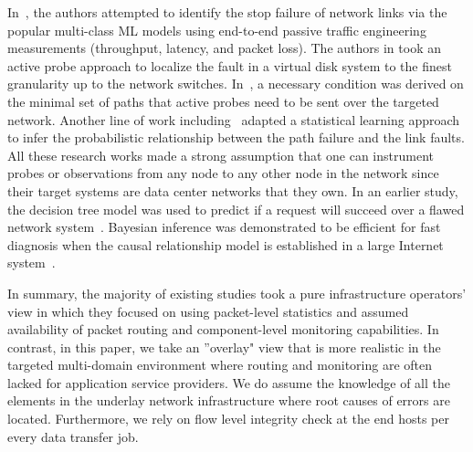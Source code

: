 In~\cite{Link-JIoT-2019}, the authors attempted to identify the stop failure of network links via the popular multi-class ML models using end-to-end passive traffic engineering measurements (throughput, latency, and packet loss). The authors in \cite{DeepView:NSDI18} took an active probe approach to localize the fault in a virtual disk system to the finest granularity up to the network switches. In~\cite{netbouncer:nsdi18}, a necessary condition was derived on the minimal set of paths that active probes need to be sent over the targeted network. Another line of work including~\cite{NetPoirot:Sigcomm2016,KDD14} adapted a statistical learning approach to infer the probabilistic relationship between the path failure and the link faults. All these research works made a strong assumption that one can instrument probes or observations from any node to any other node in the network since their target systems are data center networks that they own. In an earlier study, the decision tree model was used to predict if a request will succeed over a flawed network system~\cite{DT:2004}. Bayesian inference was demonstrated to be efficient for fast diagnosis when the causal relationship model is established in a large Internet system~\cite{BN-Internet:2007}.

In summary, the majority of existing studies took a pure infrastructure operators' view in which they focused on using packet-level statistics and assumed availability of packet routing and component-level monitoring capabilities. 
In contrast, in this paper, we take an ''overlay" view that is more realistic in the targeted multi-domain environment where routing and monitoring are often lacked for application service providers. We do assume the knowledge of all the elements in the 
underlay network infrastructure where root causes of errors are located. Furthermore, we rely on flow level integrity check at the end hosts per every data transfer job.

